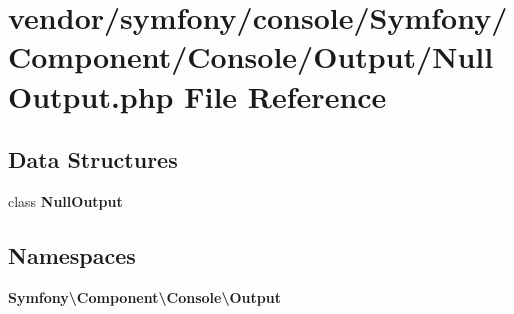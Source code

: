 \section{vendor/symfony/console/\+Symfony/\+Component/\+Console/\+Output/\+Null\+Output.php File Reference}
\label{_null_output_8php}
\subsection*{Data Structures}
\begin{DoxyCompactItemize}
\item 
class {\bf Null\+Output}
\end{DoxyCompactItemize}
\subsection*{Namespaces}
\begin{DoxyCompactItemize}
\item 
 {\bf Symfony\textbackslash{}\+Component\textbackslash{}\+Console\textbackslash{}\+Output}
\end{DoxyCompactItemize}
